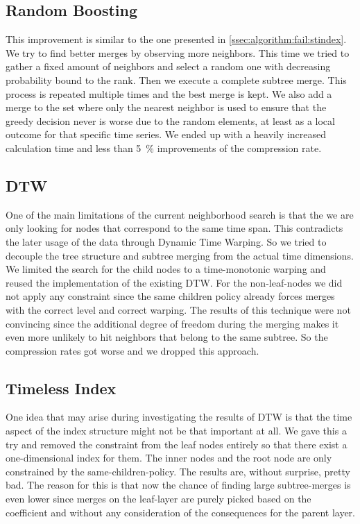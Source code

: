\subsection{Random Boosting}
\label{ssec:algorithm:fail:random}

This improvement is similar to the one presented in \autoref{ssec:algorithm:fail:stindex}. We try to find better merges by observing more neighbors. This time we tried to gather a fixed amount of neighbors and select a random one with decreasing probability bound to the rank. Then we execute a complete subtree merge. This process is repeated multiple times and the best merge is kept. We also add a merge to the set where only the nearest neighbor is used to ensure that the greedy decision never is worse due to the random elements, at least as a local outcome for that specific time series. We ended up with a heavily increased calculation time and less than \SI{5}{\percent} improvements of the compression rate.


\subsection{DTW}
\label{ssec:algorithm:fail:dtw}

One of the main limitations of the current neighborhood search is that the we are only looking for nodes that correspond to the same time span. This contradicts the later usage of the data through Dynamic Time Warping. So we tried to decouple the tree structure and subtree merging from the actual time dimensions. We limited the search for the child nodes to a time-monotonic warping and reused the implementation of the existing DTW\@. For the non-leaf-nodes we did not apply any constraint since the same children policy already forces merges with the correct level and correct warping. The results of this technique were not convincing since the additional degree of freedom during the merging makes it even more unlikely to hit neighbors that belong to the same subtree. So the compression rates got worse and we dropped this approach.


\subsection{Timeless Index}
\label{ssec:algorithm:fail:timeless}

One idea that may arise during investigating the results of DTW is that the time aspect of the index structure might not be that important at all. We gave this a try and removed the constraint from the leaf nodes entirely so that there exist a one-dimensional index for them. The inner nodes and the root node are only constrained by the same-children-policy. The results are, without surprise, pretty bad. The reason for this is that now the chance of finding large subtree-merges is even lower since merges on the leaf-layer are purely picked based on the coefficient and without any consideration of the consequences for the parent layer.


